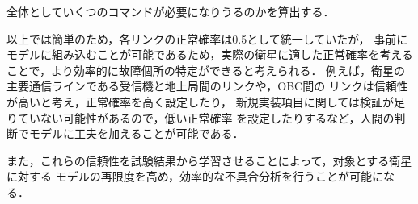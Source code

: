 \documentclass[11pt]{jsreport}
\begin{document}
全体としていくつのコマンドが必要になりうるのかを算出する．


以上では簡単のため，各リンクの正常確率は0.5として統一していたが，
事前にモデルに組み込むことが可能であるため，実際の衛星に適した正常確率を考える
ことで，より効率的に故障個所の特定ができると考えられる．
例えば，衛星の主要通信ラインである受信機と地上局間のリンクや，OBC間の
リンクは信頼性が高いと考え，正常確率を高く設定したり，
新規実装項目に関しては検証が足りていない可能性があるので，低い正常確率
を設定したりするなど，人間の判断でモデルに工夫を加えることが可能である．


また，これらの信頼性を試験結果から学習させることによって，対象とする衛星に対する
モデルの再限度を高め，効率的な不具合分析を行うことが可能になる．
\end{document}
